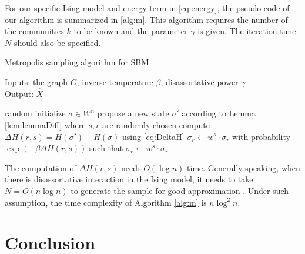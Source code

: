 \documentclass[journal]{IEEEtran}
\newcommand{\1}{\mathbbm{1}}
\begin{document}
For our specific Ising model and energy term in \eqref{eq:energy},
the pseudo code of our algorithm is summarized in \ref{alg:m}.
This algorithm requires the number of the communities $k$ to be known and the parameter $\gamma$ is given.
The iteration time $N$ should also be specified.
\begin{algorithm}[H]
	\caption{Metropolis sampling algorithm for SBM} \label{alg:m}
	Inputs: the graph $G$, inverse temperature $\beta$, disassortative power $\gamma$ \\
	Output: $\hat{X}$
	\begin{algorithmic}[1]
		\STATE random initialize $\sigma \in W^n$
		\STATE propose a new state $\bar{\sigma}'$ according to Lemma \ref{lem:lemmaDiff} where $s, r$ are randomly chosen
		\STATE compute $\Delta H(r,s) = H(\bar{\sigma}') - H(\bar{\sigma})$ using \eqref{eq:DeltaH}
		\STATE $\sigma_r \leftarrow w^s \cdot \sigma_r$
		\ELSE
		\STATE with probability $\exp(-\beta \Delta H(r,s))$
			such that $\sigma_r \leftarrow w^s \cdot \sigma_r$
		\ENDIF
		\ENDFOR
	\end{algorithmic}
\end{algorithm}
The computation of $\Delta H(r,s)$ needs $O(\log n)$ time. Generally speaking, when there is disassortative interaction in
the Ising model, it needs to take $N=O(n\log n)$ to generate the sample for good approximation \cite{mcmc}.
Under such assumption, the time complexity of Algorithm \ref{alg:m} is $n \log^2 n$.

\section{Conclusion}
\appendix
\end{document}

